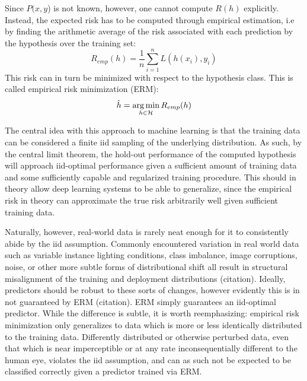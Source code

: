 		Since \(P(x,y\)) is not known, however, one cannot compute \(R(h)\) explicitly. Instead, the expected risk has to be computed through empirical estimation, i.e by finding the arithmetic average of the risk associated with each prediction by the hypothesis over the training set:
		\begin{equation}
		R_{emp}(h) = \frac{1}{n}\sum_{i=1}^{n}L(h(x_i), y_i)
		\end{equation}
		This risk can in turn be minimized with respect to the hypothesis class. This is called empirical risk minimization (ERM):
		\begin{equation}
		\hat{h} = \operatorname*{arg\,min}_{h \in \mathcal{H}}R_{emp}(h)
		\end{equation}
		
		The central idea with this approach to machine learning is that the training data can be considered a finite iid sampling of the underlying distribution. As such, by the central limit theorem, the hold-out performance of the computed hypothesis will approach iid-optimal performance given a sufficient amount of training data and some sufficiently capable and regularized training procedure. This should in theory allow deep learning systems to be able to generalize, since the empirical risk in theory can approximate the true risk arbitrarily well given sufficient training data.
		
		Naturally, however, real-world data is rarely neat enough for it to consistently abide by the iid assumption. Commonly encountered variation in real world data such as variable instance lighting conditions, class imbalance, image corruptions, noise, or other more subtle forms of distributional shift all result in structural misalignment of the training and deployment distributions (citation). Ideally, predictors should be robust to these sorts of changes, however evidently this is in not guaranteed by ERM (citation). ERM simply guarantees an iid-optimal predictor. While the difference is subtle, it is worth reemphasizing: empirical risk minimization only generalizes to data which is more or less identically distributed to the training data. Differently distributed or otherwise perturbed data, even that which is near imperceptible or at any rate inconsequentially different to the human eye, violates the iid assumption, and can as such not be expected to be classified correctly given a predictor trained via ERM. 
		
